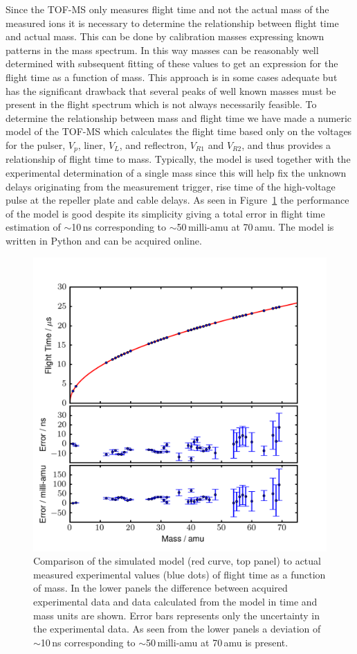 \documentclass[aip,rsi]{revtex4-1}
\begin{document}
Since the TOF-MS only measures flight time and not the actual mass of the measured ions it is necessary to determine the relationship between flight time and actual mass. This can be done by calibration masses expressing known patterns in the mass spectrum. In this way masses can be reasonably well determined with subsequent fitting of these values to get an expression for the flight time as a function of mass. This approach is in some cases adequate but has the significant drawback that several peaks of well known masses must be present in the flight spectrum which is not always necessarily feasible. To determine the relationship between mass and flight time we have made a numeric model of the TOF-MS which calculates the flight time based only on the voltages for the pulser, $V_p$, liner, $V_L$, and reflectron, $V_{R1}$ and $V_{R2}$, and thus provides a relationship of flight time to mass. Typically, the model is used together with the experimental determination of a single mass since this will help fix the unknown delays originating from the measurement trigger, rise time of the high-voltage pulse at the repeller plate and cable delays. As seen in Figure~\ref{fig:model_error} the performance of the model is good despite its simplicity giving a total error in flight time estimation of $\sim$10\,ns corresponding to $\sim$50\,milli-amu at 70\,amu. The model is written in Python and can be acquired online\cite{ModelGithub}.
\begin{figure}
 \includegraphics[width=14cm]{model_error.png}%
 \caption{Comparison of the simulated model (red curve, top panel) to actual measured experimental values (blue dots) of flight time as a function of mass. In the lower panels the difference between acquired experimental data and data calculated from the model in time and mass units are shown. Error bars represents only the uncertainty in the experimental data. As seen from the lower panels a deviation of $\sim$10\,ns corresponding to $\sim$50\,milli-amu at 70\,amu is present.\label{fig:model_error}}%
\end{figure}
\end{document}
